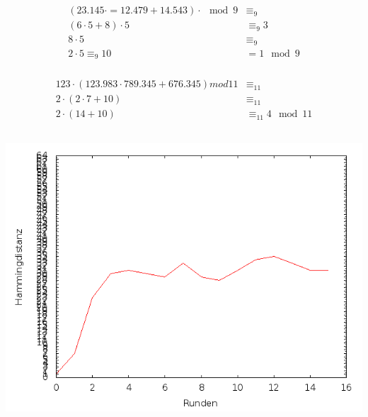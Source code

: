 \subsection{}
\subsubsection{}
\begin{align*}
 ( 23.145 \cdot = 12.479 + 14.543 ) \cdot \mod 9 & \equiv_9 \\
 ( 6 \cdot 5 + 8 ) \cdot 5 & \equiv_9  3				    \\
 8 \cdot 5 &\equiv_9 \\
 2\cdot 5 \equiv_9 10 &= 1 \mod 9 
\end{align*}

\subsubsection{}
\begin{align*}
 123 \cdot  (123.983 \cdot 789.345 + 676.345) mod 11 & \equiv_{11} \\
 2    \cdot  (2 \cdot 7 + 10) & \equiv_{11}   \\
 2 \cdot (14 + 10 ) & \equiv_{11}  4 \mod 11
\end{align*}


\subsection{}

\begin{center}
	\includegraphics[scale=0.5]{images/ueb1_4.png}
\end{center}

